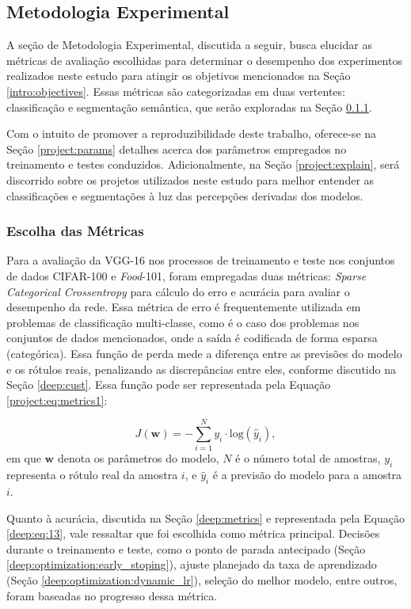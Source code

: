 \subsection{Metodologia Experimental}
\label{project:exp_result}
A seção de Metodologia Experimental, discutida a seguir, busca elucidar as métricas de avaliação escolhidas para determinar o desempenho dos experimentos realizados neste estudo para atingir os objetivos mencionados na Seção \ref{intro:objectives}. Essas métricas são categorizadas em duas vertentes: classificação e segmentação semântica, que serão exploradas na Seção \ref{project:metrics}.

Com o intuito de promover a reproduzibilidade deste trabalho, oferece-se na Seção \ref{project:params} detalhes acerca dos parâmetros empregados no treinamento e testes conduzidos. Adicionalmente, na Seção \ref{project:explain}, será discorrido sobre os projetos utilizados neste estudo para melhor entender as classificações e segmentações à luz das percepções derivadas dos modelos.

\subsubsection{Escolha das Métricas}
\label{project:metrics}
Para a avaliação da VGG-16 nos processos de treinamento e teste nos conjuntos de dados CIFAR-100 e \textit{Food}-101, foram empregadas duas métricas: \textit{Sparse Categorical Crossentropy} para cálculo do erro e acurácia para avaliar o desempenho da rede. Essa métrica de erro é frequentemente utilizada em problemas de classificação multi-classe, como é o caso dos problemas nos conjuntos de dados mencionados, onde a saída é codificada de forma esparsa (categórica). Essa função de perda mede a diferença entre as previsões do modelo e os rótulos reais, penalizando as discrepâncias entre eles, conforme discutido na Seção \ref{deep:cust}. Essa função pode ser representada pela Equação \ref{project:eq:metrics1}:

\begin{equation}
    \label{project:eq:metrics1}
    J(\boldsymbol{w}) = - \sum_{i=1}^{N} y_i \cdot \text{log}(\hat{y}_i),
\end{equation}
em que $\boldsymbol{w}$ denota os parâmetros do modelo, $N$ é o número total de amostras, $y_i$ representa o rótulo real da amostra $i$, e $\hat{y}_i$ é a previsão do modelo para a amostra $i$.

Quanto à acurácia, discutida na Seção \ref{deep:metrics} e representada pela Equação \ref{deep:eq:13}, vale ressaltar que foi escolhida como métrica principal. Decisões durante o treinamento e teste, como o ponto de parada antecipado (Seção \ref{deep:optimization:early_stoping}), ajuste planejado da taxa de aprendizado (Seção \ref{deep:optimization:dynamic_lr}), seleção do melhor modelo, entre outros, foram baseadas no progresso dessa métrica.

